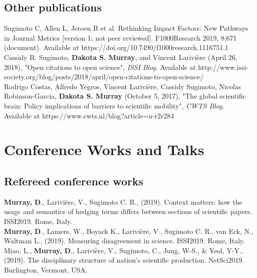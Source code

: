\documentclass[10pt, a4paper]{article}
\newcommand{\years}[1]{\marginnote{\scriptsize #1}}
\begin{document}
\subsection*{Other publications}
\noindent

\years{2019} \hangindent=0.7cm Sugimoto C, Allen L, Jeroen B et al. Rethinking Impact Factors: New Pathways in Journal Metrics [version 1; not peer reviewed]. F1000Research 2019, 8:671 (document). Available at https://doi.org/10.7490/f1000research.1116751.1\\

\years{2018} \hangindent=0.7cm Cassidy R. Sugimoto, \textbf{Dakota S. Murray}, and Vincent Larivière (April 26, 2018), "Open citations to open science", \emph{ISSI Blog}. Available at http://www.issi-society.org/blog/posts/2018/april/open-citations-to-open-science/\\

\years{2017} \hangindent=0.7cm Rodrigo Costas, Alfredo Yegros, Vincent Larivière, Cassidy Sugimoto, Nicolas Robinson-Garcia, \textbf{Dakota S. Murray} (October 5, 2017), "The global scientific brain: Policy implications of barriers to scientific mobility", \emph{CWTS Blog}. Available at https://www.cwts.nl/blog?article=n-r2r284

\section*{Conference Works and Talks}

\subsection*{Refereed conference works}

\years{2019} \hangindent=0.7cm \textbf{Murray, D}., Larivière, V., Sugimoto C. R., (2019). Context matters: how the usage and semantics of hedging terms differs between sections of scientific papers. ISSI2019. Rome, Italy.\\

\years{2019} \hangindent=0.7cm  \textbf{Murray, D}., Lamers, W., Boyack K., Larivière, V., Sugimoto C. R., van Eck, N., Waltman L., (2019). Measuring disagreement in science. ISSI2019. Rome, Italy.\\

\years{2019} \hangindent=0.7cm Miao, L., \textbf{Murray, D}., Larivière, V., Sugimoto, C., Jung, W-S., \&  Yeol, Y-Y., (2019). The disciplinary structure of nation's scientific production. NetSci2019. Burlington, Vermont, USA.\\
\end{document}
